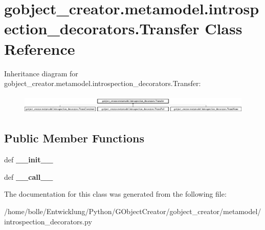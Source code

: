\hypertarget{classgobject__creator_1_1metamodel_1_1introspection__decorators_1_1Transfer}{
\section{gobject\_\-creator.metamodel.introspection\_\-decorators.Transfer Class Reference}
\label{classgobject__creator_1_1metamodel_1_1introspection__decorators_1_1Transfer}
}
Inheritance diagram for gobject\_\-creator.metamodel.introspection\_\-decorators.Transfer:\begin{figure}[H]
\begin{center}
\leavevmode
\includegraphics[height=0.917281cm]{classgobject__creator_1_1metamodel_1_1introspection__decorators_1_1Transfer}
\end{center}
\end{figure}
\subsection*{Public Member Functions}
\begin{DoxyCompactItemize}
\item 
\hypertarget{classgobject__creator_1_1metamodel_1_1introspection__decorators_1_1Transfer_a3736407425b09def9131d8cafda1f7b1}{
def {\bfseries \_\-\_\-init\_\-\_\-}}
\label{classgobject__creator_1_1metamodel_1_1introspection__decorators_1_1Transfer_a3736407425b09def9131d8cafda1f7b1}

\item 
\hypertarget{classgobject__creator_1_1metamodel_1_1introspection__decorators_1_1Transfer_af336cef271d90a77fadb65bd8d9d0ecf}{
def {\bfseries \_\-\_\-call\_\-\_\-}}
\label{classgobject__creator_1_1metamodel_1_1introspection__decorators_1_1Transfer_af336cef271d90a77fadb65bd8d9d0ecf}

\end{DoxyCompactItemize}


The documentation for this class was generated from the following file:\begin{DoxyCompactItemize}
\item 
/home/bolle/Entwicklung/Python/GObjectCreator/gobject\_\-creator/metamodel/introspection\_\-decorators.py\end{DoxyCompactItemize}
